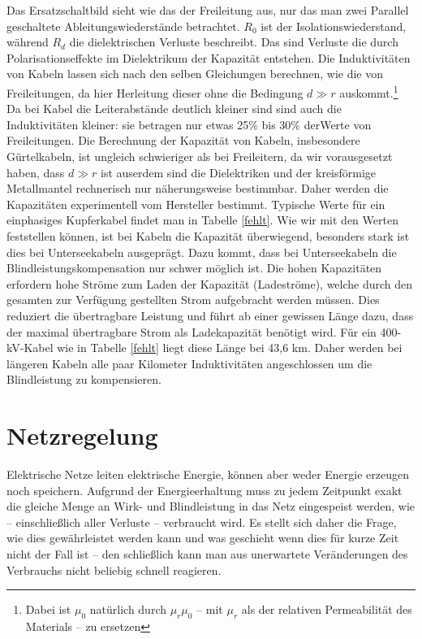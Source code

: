 \documentclass[10pt,a4paper]{article}
\begin{document}
Das Ersatzschaltbild sieht wie das der Freileitung aus, nur das man zwei Parallel geschaltete Ableitungswiederstände betrachtet.
$R_0$ ist der Isolationswiederstand, während $R_d$ die dielektrischen Verluste beschreibt. Das sind Verluste die durch Polarisationseffekte im Dielektrikum der Kapazität entstehen.
Die Induktivitäten von Kabeln lassen sich nach den selben Gleichungen berechnen, wie die von Freileitungen, da hier Herleitung dieser ohne die Bedingung $d\gg r$ auskommt.\footnote{Dabei ist $\mu_0$ natürlich durch $\mu_r\mu_0$ – mit $\mu_r$ als der relativen Permeabilität des Materials – zu ersetzen} %
Da bei Kabel die Leiterabstände deutlich kleiner sind sind auch die Induktivitäten kleiner: sie betragen nur etwas 25\% bis 30\% derWerte von Freileitungen\cite{Flosdorff}.
Die Berechnung der Kapazität von Kabeln, insbesondere Gürtelkabeln, ist ungleich schwieriger als bei Freileitern, da wir vorausgesetzt haben, dass $d\gg r$ ist auserdem sind die Dielektriken und der kreisförmige Metallmantel rechnerisch nur näherungsweise bestimmbar. Daher werden die Kapazitäten experimentell vom Hersteller bestimmt.\cite{Flosdorff}
Typische Werte für ein einphasiges Kupferkabel findet man in Tabelle \ref{fehlt}.
Wie wir mit den Werten feststellen können, ist bei Kabeln die Kapazität überwiegend,
besonders stark ist dies bei Unterseekabeln ausgeprägt. %
Dazu kommt, dass bei Unterseekabeln die Blindleistungskompensation nur schwer möglich ist.
Die hohen Kapazitäten erfordern hohe Ströme zum Laden der Kapazität (Ladeströme), welche durch den gesamten zur Verfügung gestellten Strom aufgebracht werden müssen. Dies reduziert die übertragbare Leistung und führt ab einer gewissen Länge dazu, dass der maximal übertragbare Strom als Ladekapazität benötigt wird. %
Für ein 400-kV-Kabel wie in Tabelle \ref{fehlt} liegt diese Länge bei 43,6 km.
Daher werden bei längeren Kabeln alle paar Kilometer %
Induktivitäten angeschlossen um die Blindleistung zu kompensieren.

\section{Netzregelung}
Elektrische Netze leiten elektrische Energie, können aber weder Energie erzeugen noch speichern.
Aufgrund der Energieerhaltung muss zu jedem Zeitpunkt exakt die gleiche Menge an Wirk- und Blindleistung in das Netz eingespeist werden, wie – einschließlich aller Verluste – verbraucht wird.
Es stellt sich daher die Frage, wie dies gewährleistet werden kann und was geschieht wenn dies für kurze Zeit nicht der Fall ist – den schließlich kann man aus unerwartete Veränderungen des Verbrauchs nicht beliebig schnell reagieren.
\end{document}
